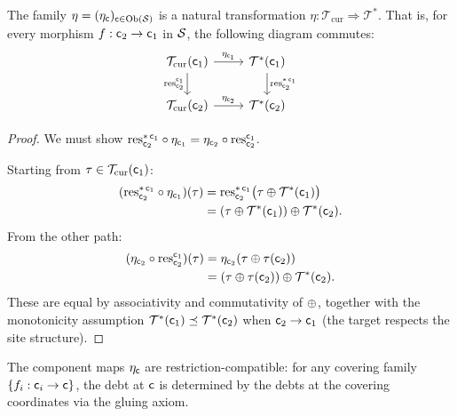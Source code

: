\documentclass[11pt]{article}
\begin{document}
\begin{theorem}[Naturality]\label{thm:naturality}
The family $\eta = (\eta_{\mathsf{c}})_{\mathsf{c} \in \mathrm{Ob}(\mathcal{S})}$ is a
natural transformation
$\eta : \mathcal{T}_{\mathrm{cur}} \Rightarrow \mathcal{T}^*$.
That is, for every morphism $f : \mathsf{c}_2 \to \mathsf{c}_1$ in $\mathcal{S}$,
the following diagram commutes:
\[
\begin{tikzcd}
  \mathcal{T}_{\mathrm{cur}}(\coord_1)
    \arrow[r, "\eta_{\coord_1}"]
    \arrow[d, "\res^{\coord_1}_{\coord_2}"']
  & \mathcal{T}^*(\coord_1)
    \arrow[d, "\res^{*\,\coord_1}_{\coord_2}"] \\
  \mathcal{T}_{\mathrm{cur}}(\coord_2)
    \arrow[r, "\eta_{\coord_2}"]
  & \mathcal{T}^*(\coord_2)
\end{tikzcd}
\]
\end{theorem}

\begin{proof}
We must show $\mathrm{res}^{*\,\mathsf{c}_1}_{\mathsf{c}_2} \circ \eta_{\mathsf{c}_1}
= \eta_{\mathsf{c}_2} \circ \mathrm{res}^{\mathsf{c}_1}_{\mathsf{c}_2}$.

Starting from $\tau \in \mathcal{T}_{\mathrm{cur}}(\mathsf{c}_1)$:
\begin{align*}
  (\mathrm{res}^{*\,\mathsf{c}_1}_{\mathsf{c}_2} \circ \eta_{\mathsf{c}_1})(\tau)
  &= \mathrm{res}^{*\,\mathsf{c}_1}_{\mathsf{c}_2}
     \bigl(\tau \oplus \mathcal{T}^*(\mathsf{c}_1)\bigr) \\
  &= (\tau \oplus \mathcal{T}^*(\mathsf{c}_1)) \oplus
     \mathcal{T}^*(\mathsf{c}_2).
\end{align*}
From the other path:
\begin{align*}
  (\eta_{\mathsf{c}_2} \circ \mathrm{res}^{\mathsf{c}_1}_{\mathsf{c}_2})(\tau)
  &= \eta_{\mathsf{c}_2}(\tau \oplus \tau(\mathsf{c}_2)) \\
  &= (\tau \oplus \tau(\mathsf{c}_2)) \oplus \mathcal{T}^*(\mathsf{c}_2).
\end{align*}
These are equal by associativity and commutativity of $\oplus$,
together with the monotonicity assumption
$\mathcal{T}^*(\mathsf{c}_1) \preceq \mathcal{T}^*(\mathsf{c}_2)$
when $\mathsf{c}_2 \to \mathsf{c}_1$ (the target respects the site structure).
\end{proof}

\begin{corollary}\label{cor:restrict-compat}
The component maps $\eta_{\mathsf{c}}$ are restriction-compatible:
for any covering family $\{f_i : \mathsf{c}_i \to \mathsf{c}\}$,
the debt at $\mathsf{c}$ is determined by the debts at the covering
coordinates via the gluing axiom.
\end{corollary}
\end{document}
